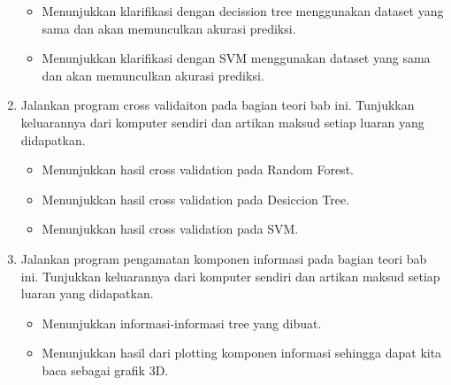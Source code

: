\begin{enumerate}
	\hfill\break
	\begin{itemize}
		\item Menunjukkan klarifikasi dengan decission tree menggunakan dataset yang sama dan akan memunculkan akurasi prediksi.
		
		\item Menunjukkan klarifikasi dengan SVM menggunakan dataset yang sama dan akan memunculkan akurasi prediksi.
		
	\end{itemize}
	\item Jalankan program cross validaiton pada bagian teori bab ini. Tunjukkan keluarannya dari komputer sendiri dan artikan maksud setiap luaran yang didapatkan.
	\hfill\break
	\begin{itemize}
		\item Menunjukkan hasil cross validation pada Random Forest.
		
		\item Menunjukkan hasil cross validation pada Desiccion Tree.
		
		\item Menunjukkan hasil cross validation pada SVM.
		
	\end{itemize}
	\item Jalankan program pengamatan komponen informasi pada bagian teori bab ini. Tunjukkan keluarannya dari komputer sendiri dan artikan maksud setiap luaran yang didapatkan.
	\hfill\break
	\begin{itemize}
		\item Menunjukkan informasi-informasi tree yang dibuat.
		
		\item Menunjukkan hasil dari plotting komponen informasi sehingga dapat kita baca sebagai grafik 3D.
		
	\end{itemize}
\end{enumerate}
